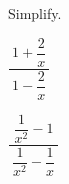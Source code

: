 



\newpage

\begin{exercise}
	Simplify.\\
	\begin{enumerate*}[label={(\arabic*)~}]
		\item $\dfrac{~1+\dfrac{2}{x}~}{~1-\dfrac{2}{x}~}$
		\item $\dfrac{~\dfrac{1}{x^2}-1~}{~\dfrac{1}{x^2}-\dfrac{1}{x}~}$
		\hfill\null
	\end{enumerate*}
\end{exercise}

\vfill
\begin{center} \hfill
\end{center}

